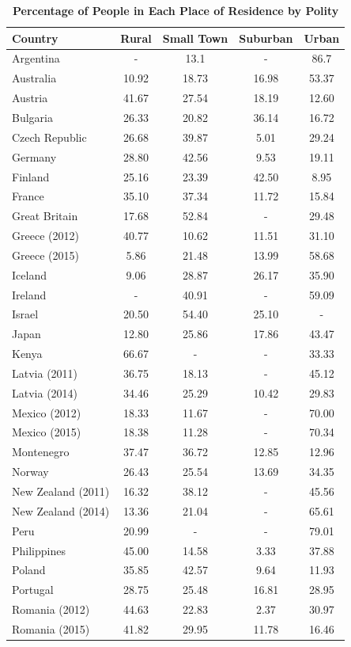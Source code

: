 \documentclass[12pt, titlepage]{article}
\newcommand\tb{\textbf}
\begin{document}
\begin{table}[h!]
	\centering
	\caption{\tb{Percentage of People in Each Place of Residence by Polity}}
	\begin{tabulary}{\linewidth}{l c c c c}
		\hline
		\tb{Country}&\tb{Rural}&\tb{Small Town}&\tb{Suburban}&\tb{Urban}\\
		\hline
		Argentina&-&13.1&-&86.7 \\
		Australia&10.92&18.73&16.98&53.37 \\
		Austria&41.67&27.54&18.19&12.60 \\
		Bulgaria&26.33&20.82&36.14&16.72 \\
		Czech Republic&26.68&39.87&5.01&29.24 \\
		Germany&28.80&42.56&9.53&19.11 \\
		Finland&25.16&23.39&42.50&8.95 \\
		France&35.10&37.34&11.72&15.84 \\
		Great Britain&17.68&52.84&-&29.48 \\
		Greece (2012)&40.77&10.62&11.51&31.10 \\
		Greece (2015)&5.86&21.48&13.99&58.68 \\
		Iceland&9.06&28.87&26.17&35.90 \\
		Ireland&-&40.91&-&59.09 \\
		Israel&20.50&54.40&25.10&- \\
		Japan&12.80&25.86&17.86&43.47 \\
		Kenya&66.67&-&-&33.33 \\
		Latvia (2011)&36.75&18.13&-&45.12 \\
		Latvia (2014)&34.46&25.29&10.42&29.83 \\
		Mexico (2012)&18.33&11.67&-&70.00 \\
		Mexico (2015)&18.38&11.28&-&70.34 \\
		Montenegro&37.47&36.72&12.85&12.96 \\
		Norway&26.43&25.54&13.69&34.35 \\
		New Zealand (2011)&16.32&38.12&-&45.56 \\
		New Zealand (2014)&13.36&21.04&-&65.61 \\
		Peru&20.99&-&-&79.01 \\
		Philippines&45.00&14.58&3.33&37.88 \\
		Poland&35.85&42.57&9.64&11.93 \\
		Portugal&28.75&25.48&16.81&28.95 \\
		Romania (2012)&44.63&22.83&2.37&30.97 \\
		Romania (2015)&41.82&29.95&11.78&16.46 \\

\end{tabulary}
\end{table}
\end{document}
